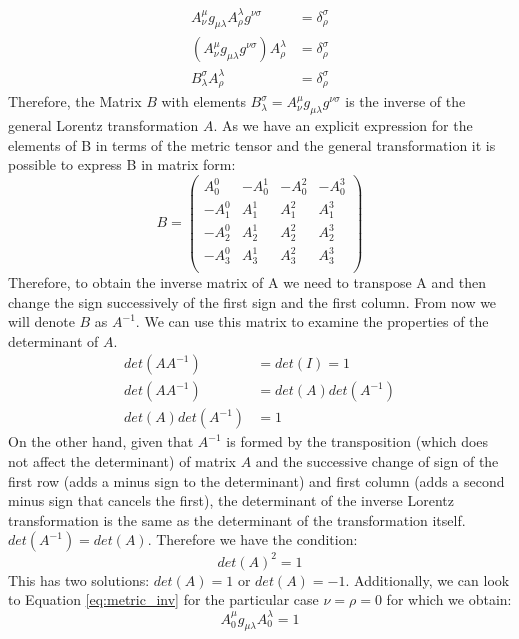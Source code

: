 \begin{align}
    A^\mu_\nu  g_{\mu\lambda}  A^\lambda_\rho  g^{\nu\sigma} &= \delta^\sigma_\rho \\
    \left( A^\mu_\nu  g_{\mu\lambda}  g^{\nu\sigma}\right)  A^\lambda_\rho&= \delta^\sigma_\rho \\
    B^\sigma_\lambda  A^\lambda_\rho &=  \delta^\sigma_\rho
\end{align}
Therefore, the Matrix $B$ with elements $ B^\sigma_\lambda  = A^\mu_\nu  g_{\mu\lambda}  g^{\nu\sigma} $ is the inverse of the general Lorentz transformation $A$. As we have an explicit expression for the elements of B in terms of the metric tensor and the general transformation it is possible to express B in matrix form:
\begin{equation}
    B= \begin{pmatrix}
        A^0_0 & -A^1_0& -A^2_0 & -A^3_0\\
-A^0_1 & A^1_1 & A^2_1 & A^3_1\\
-A^0_2 & A^1_2 & A^2_2 & A^3_2\\
-A^0_3 & A^1_3 & A^2_3 & A^3_3\\
    \end{pmatrix}
\end{equation}
Therefore, to obtain the inverse matrix of A we need to transpose A and then change the sign successively of the first sign and the first column. From now we will denote $B$ as $A^{-1}$. We can use this matrix to examine the properties of the determinant of $A$.
\begin{align}
    det(AA^{-1}) &= det(I) = 1 \\
     det(AA^{-1}) &= det(A)det(A^{-1}) \\
      det(A)det(A^{-1})  &= 1
\end{align}
On the other hand, given that $A^{-1}$ is formed by the transposition (which does not affect the determinant) of matrix $A$ and the successive change of sign of the first row (adds a minus sign to the determinant) and first column (adds a second minus sign that cancels the first), the determinant of the inverse Lorentz transformation is the same as the determinant of the transformation itself. $det(A^{-1}) = det(A)$. Therefore we have the condition:
\begin{equation}
    det(A)^2 = 1
\end{equation}
This has two solutions: $det(A) =1$ or $det(A) = -1$. Additionally, we can look to Equation \ref{eq:metric_inv} for the particular case $\nu=\rho=0$ for which we obtain:
\begin{equation}
    A^\mu_0 g_{\mu\lambda}  A^\lambda_0 = 1
\end{equation}
